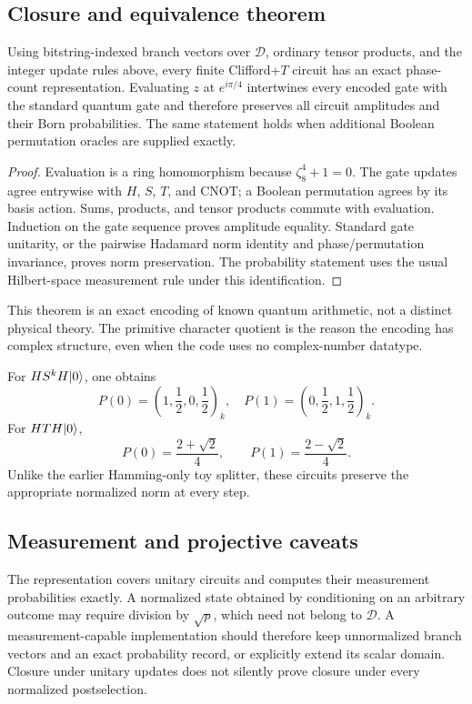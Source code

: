 \subsection{Closure and equivalence theorem}
\begin{theorem}\label{thm:exact}
Using bitstring-indexed branch vectors over $\mathcal D$, ordinary tensor products, and the integer update rules above, every finite Clifford+$T$ circuit has an exact phase-count representation. Evaluating $z$ at $e^{i\pi/4}$ intertwines every encoded gate with the standard quantum gate and therefore preserves all circuit amplitudes and their Born probabilities. The same statement holds when additional Boolean permutation oracles are supplied exactly.
\end{theorem}
\begin{proof}
Evaluation is a ring homomorphism because $\zeta_8^4+1=0$. The gate updates agree entrywise with $H$, $S$, $T$, and CNOT; a Boolean permutation agrees by its basis action. Sums, products, and tensor products commute with evaluation. Induction on the gate sequence proves amplitude equality. Standard gate unitarity, or the pairwise Hadamard norm identity and phase/permutation invariance, proves norm preservation. The probability statement uses the usual Hilbert-space measurement rule under this identification.
\end{proof}
This theorem is an exact encoding of known quantum arithmetic, not a distinct physical theory. The primitive character quotient is the reason the encoding has complex structure, even when the code uses no complex-number datatype.

For $H S^k H\lvert 0\rangle$, one obtains
\begin{equation}
 P(0)=\left(1,\frac12,0,\frac12\right)_k,\quad
 P(1)=\left(0,\frac12,1,\frac12\right)_k.
\end{equation}
For $HTH\lvert 0\rangle$,
\begin{equation}
 P(0)=\frac{2+\sqrt2}{4},\qquad P(1)=\frac{2-\sqrt2}{4}.
\end{equation}
Unlike the earlier Hamming-only toy splitter, these circuits preserve the appropriate normalized norm at every step.

\subsection{Measurement and projective caveats}
The representation covers unitary circuits and computes their measurement probabilities exactly. A normalized state obtained by conditioning on an arbitrary outcome may require division by $\sqrt p$, which need not belong to $\mathcal D$. A measurement-capable implementation should therefore keep unnormalized branch vectors and an exact probability record, or explicitly extend its scalar domain. Closure under unitary updates does not silently prove closure under every normalized postselection.

